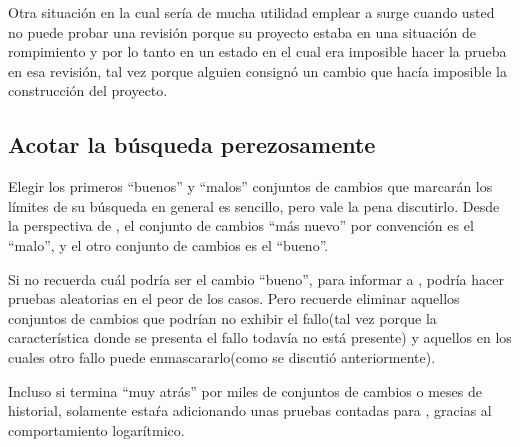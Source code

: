 Otra situación en la cual sería de mucha utilidad emplear a
 surge cuando usted no puede probar una
revisión porque su proyecto estaba en una situación de rompimiento y
por lo tanto en un estado en el cual era imposible hacer la prueba en
esa revisión, tal vez porque alguien consignó un cambio que hacía
imposible la construcción del proyecto.

\subsection{Acotar la búsqueda perezosamente}

Elegir los primeros ``buenos'' y ``malos'' conjuntos de cambios que
marcarán los límites de su búsqueda en general es sencillo, pero vale
la pena discutirlo.  Desde la perspectiva de , el
conjunto de cambios ``más nuevo'' por convención es el ``malo'', y el
otro conjunto de cambios es el ``bueno''.

Si no recuerda cuál podría ser el cambio ``bueno'', para informar a
, podría hacer pruebas aleatorias en el peor de los
casos. Pero recuerde eliminar aquellos conjuntos de cambios que
podrían no exhibir el fallo(tal vez porque la característica donde se
presenta el fallo todavía no está presente) y aquellos en los cuales
otro fallo puede enmascararlo(como se discutió anteriormente).

Incluso si termina ``muy atrás'' por miles de conjuntos de cambios o
meses de historial, solamente estaŕa adicionando unas pruebas contadas
para , gracias al comportamiento logarítmico.

